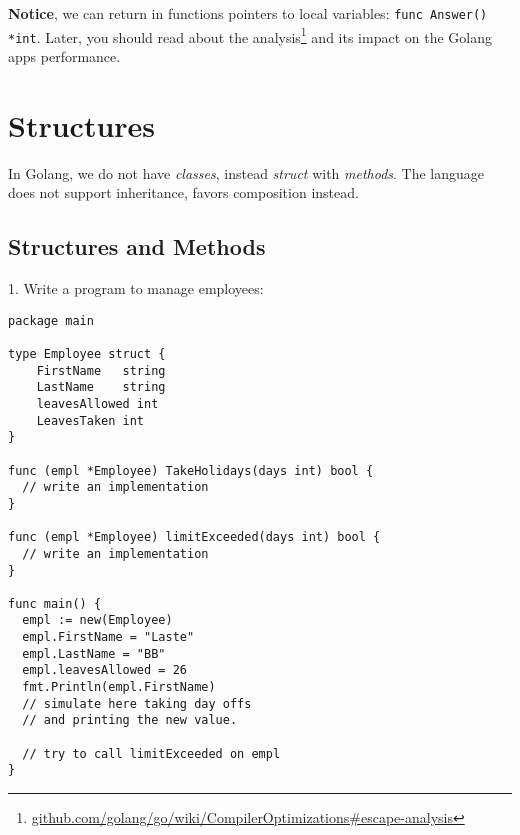 \documentclass[11pt, letterpaper]{article}
\begin{document}
\textbf{Notice}, we can return in functions pointers to local variables: \texttt{func Answer() *int}. Later, you should read about the analysis\footnote{\href{https://github.com/golang/go/wiki/CompilerOptimizations\#escape-analysis}{github.com/golang/go/wiki/CompilerOptimizations\#escape-analysis}} and its impact on the Golang apps performance.

\section{Structures}

In Golang, we do not have \emph{classes}, instead \emph{struct} with \emph{methods}. The language does not support inheritance, favors composition instead.

\subsection{Structures and Methods}

1. Write a program to manage employees:

\begin{verbatim}
package main

type Employee struct {
    FirstName   string
    LastName    string
    leavesAllowed int
    LeavesTaken int
}

func (empl *Employee) TakeHolidays(days int) bool {
  // write an implementation
}

func (empl *Employee) limitExceeded(days int) bool {
  // write an implementation
}

func main() {
  empl := new(Employee)
  empl.FirstName = "Laste"
  empl.LastName = "BB"
  empl.leavesAllowed = 26
  fmt.Println(empl.FirstName)
  // simulate here taking day offs
  // and printing the new value.

  // try to call limitExceeded on empl
}
\end{verbatim}

\bigskip



\end{document}
